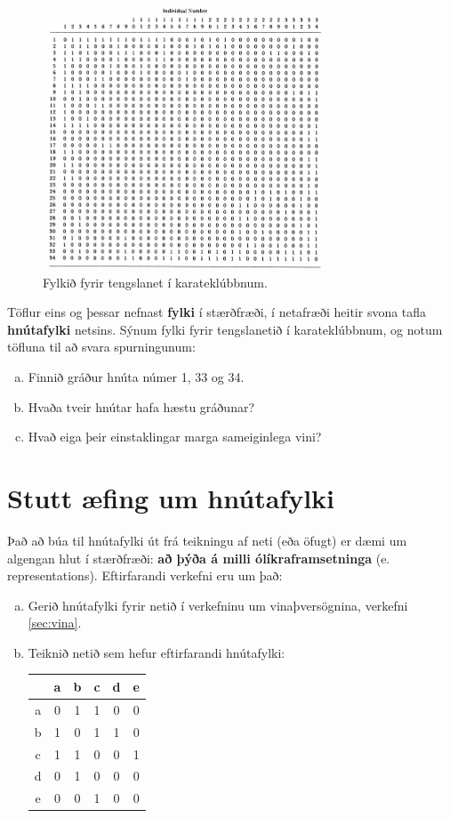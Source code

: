 \documentclass[b5paper,12pt]{book}
\begin{document}
\begin{figure}[h]
  \includegraphics[width=0.75\textwidth, center]{Karatetafla.png}
  \caption*{Fylkið fyrir tengslanet í karateklúbbnum.}
\end{figure}

Töflur eins og þessar nefnast \textbf{fylki} í stærðfræði, í netafræði heitir svona tafla \textbf{hnútafylki} netsins. Sýnum fylki fyrir tengslanetið í karateklúbbnum, og notum töfluna til að svara spurningunum:
\begin{enumerate}[(a)]
    \item Finnið gráður hnúta númer 1, 33 og 34. 
    \item Hvaða tveir hnútar hafa hæstu gráðunar?
    \item Hvað eiga þeir einstaklingar marga sameiginlega vini?
\end{enumerate}

\section{Stutt æfing um hnútafylki}
Það að búa til hnútafylki út frá teikningu af neti (eða öfugt) er dæmi um algengan hlut í stærðfræði: \textbf{að þýða á milli ólíkraframsetninga} (e. representations). Eftirfarandi verkefni eru um það: 
\begin{enumerate}[(a)]
    \item Gerið hnútafylki fyrir netið í verkefninu um vinaþversögnina, verkefni \ref{sec:vina}.
    \item Teiknið netið sem hefur eftirfarandi hnútafylki:

\begin{tabular}{ c | c c c c c } 
      & a & b & c & d & e \\
    \hline
    a & 0 & 1 & 1 & 0 & 0 \\
    b & 1 & 0 & 1 & 1 & 0 \\
    c & 1 & 1 & 0 & 0 & 1 \\
    d & 0 & 1 & 0 & 0 & 0 \\
    e & 0 & 0 & 1 & 0 & 0 
\end{tabular}
\end{enumerate}
\end{document}
